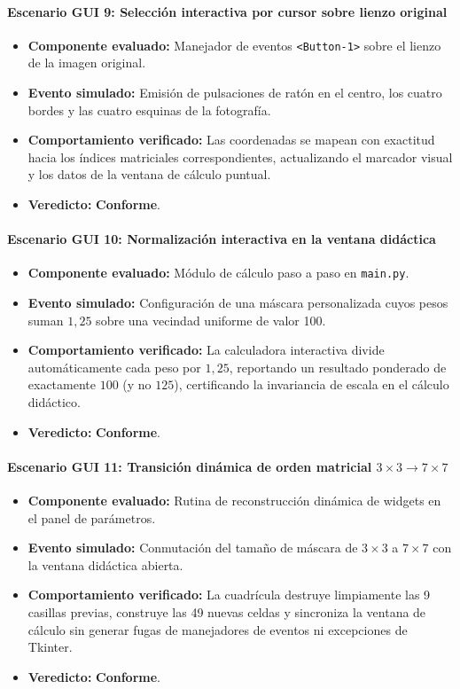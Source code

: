 \documentclass[11pt]{article}
\newcommand{\pruebaok}{\textcolor{verdeExito}{\textbf{Conforme}}}
\begin{document}
\paragraph{Escenario GUI 9: Selección interactiva por cursor sobre lienzo original}
\begin{itemize}[itemsep=0.15em]
\item \textbf{Componente evaluado:} Manejador de eventos \texttt{<Button-1>} sobre el lienzo de la imagen original.
\item \textbf{Evento simulado:} Emisión de pulsaciones de ratón en el centro, los cuatro bordes y las cuatro esquinas de la fotografía.
\item \textbf{Comportamiento verificado:} Las coordenadas se mapean con exactitud hacia los índices matriciales correspondientes, actualizando el marcador visual y los datos de la ventana de cálculo puntual.
\item \textbf{Veredicto:} \pruebaok.
\end{itemize}

\paragraph{Escenario GUI 10: Normalización interactiva en la ventana didáctica}
\begin{itemize}[itemsep=0.15em]
\item \textbf{Componente evaluado:} Módulo de cálculo paso a paso en \texttt{main.py}.
\item \textbf{Evento simulado:} Configuración de una máscara personalizada cuyos pesos suman $1,25$ sobre una vecindad uniforme de valor 100.
\item \textbf{Comportamiento verificado:} La calculadora interactiva divide automáticamente cada peso por $1,25$, reportando un resultado ponderado de exactamente $100$ (y no $125$), certificando la invariancia de escala en el cálculo didáctico.
\item \textbf{Veredicto:} \pruebaok.
\end{itemize}

\paragraph{Escenario GUI 11: Transición dinámica de orden matricial $3\times3 \to 7\times7$}
\begin{itemize}[itemsep=0.15em]
\item \textbf{Componente evaluado:} Rutina de reconstrucción dinámica de widgets en el panel de parámetros.
\item \textbf{Evento simulado:} Conmutación del tamaño de máscara de $3\times3$ a $7\times7$ con la ventana didáctica abierta.
\item \textbf{Comportamiento verificado:} La cuadrícula destruye limpiamente las 9 casillas previas, construye las 49 nuevas celdas y sincroniza la ventana de cálculo sin generar fugas de manejadores de eventos ni excepciones de Tkinter.
\item \textbf{Veredicto:} \pruebaok.
\end{itemize}
\end{document}
